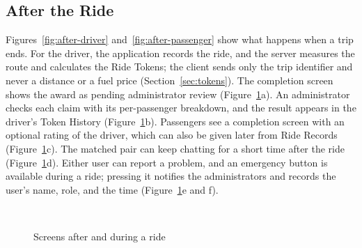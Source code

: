 \subsection{After the Ride}
\label{sec:flow-after}
Figures~\ref{fig:after-driver} and~\ref{fig:after-passenger} show what happens when a trip ends. For the driver, the application records the ride, and the server measures the route and calculates the Ride Tokens; the client sends only the trip identifier and never a distance or a fuel price (Section~\ref{sec:tokens}). The completion screen shows the award as pending administrator review (Figure~\ref{fig:ui-after}a). An administrator checks each claim with its per-passenger breakdown, and the result appears in the driver's Token History (Figure~\ref{fig:ui-after}b). Passengers see a completion screen with an optional rating of the driver, which can also be given later from Ride Records (Figure~\ref{fig:ui-after}c). The matched pair can keep chatting for a short time after the ride (Figure~\ref{fig:ui-after}d). Either user can report a problem, and an emergency button is available during a ride; pressing it notifies the administrators and records the user's name, role, and the time (Figure~\ref{fig:ui-after}e and f).



    \begin{figure}[htbp]
        \centering
        \hfill
        \hfill
        \\[6pt]
        \hfill
        \hfill
        \caption{Screens after and during a ride}
        \label{fig:ui-after}
    \end{figure}

